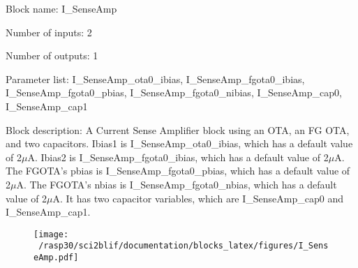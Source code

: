 \pagebreak

Block name: I\_SenseAmp

Number of inputs: 2

Number of outputs: 1

Parameter list: I\_SenseAmp\_ota0\_ibias, I\_SenseAmp\_fgota0\_ibias, I\_SenseAmp\_fgota0\_pbias, I\_SenseAmp\_fgota0\_nibias, I\_SenseAmp\_cap0, I\_SenseAmp\_cap1

Block description: 
A Current Sense Amplifier block using an OTA, an FG OTA, and two capacitors. Ibias1 is I\_SenseAmp\_ota0\_ibias, which has a default value of 2$\mu$A. Ibias2 is I\_SenseAmp\_fgota0\_ibias, which has a default value of 2$\mu$A. The FGOTA's pbias is I\_SenseAmp\_fgota0\_pbias, which has a default value of 2$\mu$A. The FGOTA's nbias is I\_SenseAmp\_fgota0\_nbias, which has a default value of 2$\mu$A. It has two capacitor variables, which are I\_SenseAmp\_cap0 and I\_SenseAmp\_cap1.

\begin{figure}[H]  %
\texttt{[image: ~/rasp30/sci2blif/documentation/blocks\_latex/figures/I\_SenseAmp.pdf]}
\end{figure}

